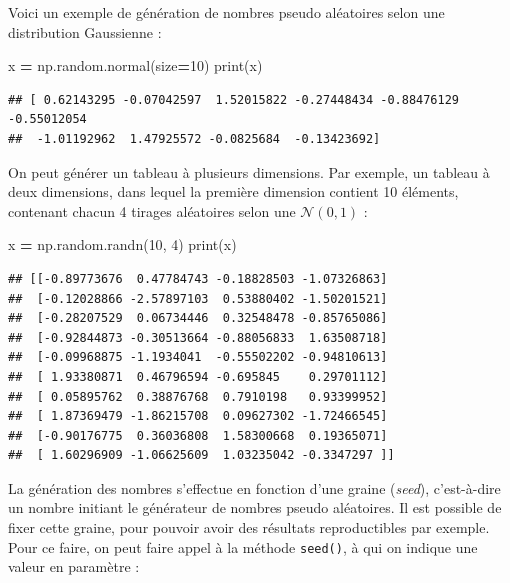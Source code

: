 \documentclass[12pt,]{book}
\newenvironment{Shaded}{\begin{snugshade}}{\end{snugshade}}
\newcommand{\DecValTok}[1]{\textcolor[rgb]{0.00,0.00,0.81}{#1}}
\newcommand{\OperatorTok}[1]{\textcolor[rgb]{0.81,0.36,0.00}{\textbf{#1}}}
\newcommand{\BuiltInTok}[1]{#1}
\newcommand{\NormalTok}[1]{#1}
\numberwithin{equation}{section}
\numberwithin{countremarque}{section}
\begin{document}
Voici un exemple de génération de nombres pseudo aléatoires selon une
distribution Gaussienne :

\begin{Shaded}
\begin{Highlighting}[]
\NormalTok{x }\OperatorTok{=}\NormalTok{ np.random.normal(size}\OperatorTok{=}\DecValTok{10}\NormalTok{)}
\BuiltInTok{print}\NormalTok{(x)}
\end{Highlighting}
\end{Shaded}

\begin{lstlisting}
## [ 0.62143295 -0.07042597  1.52015822 -0.27448434 -0.88476129 -0.55012054
##  -1.01192962  1.47925572 -0.0825684  -0.13423692]
\end{lstlisting}

On peut générer un tableau à plusieurs dimensions. Par exemple, un
tableau à deux dimensions, dans lequel la première dimension contient 10
éléments, contenant chacun 4 tirages aléatoires selon une
\(\mathcal{N}(0,1)\) :

\begin{Shaded}
\begin{Highlighting}[]
\NormalTok{x }\OperatorTok{=}\NormalTok{ np.random.randn(}\DecValTok{10}\NormalTok{, }\DecValTok{4}\NormalTok{)}
\BuiltInTok{print}\NormalTok{(x)}
\end{Highlighting}
\end{Shaded}

\begin{lstlisting}
## [[-0.89773676  0.47784743 -0.18828503 -1.07326863]
##  [-0.12028866 -2.57897103  0.53880402 -1.50201521]
##  [-0.28207529  0.06734446  0.32548478 -0.85765086]
##  [-0.92844873 -0.30513664 -0.88056833  1.63508718]
##  [-0.09968875 -1.1934041  -0.55502202 -0.94810613]
##  [ 1.93380871  0.46796594 -0.695845    0.29701112]
##  [ 0.05895762  0.38876768  0.7910198   0.93399952]
##  [ 1.87369479 -1.86215708  0.09627302 -1.72466545]
##  [-0.90176775  0.36036808  1.58300668  0.19365071]
##  [ 1.60296909 -1.06625609  1.03235042 -0.3347297 ]]
\end{lstlisting}

La génération des nombres s'effectue en fonction d'une graine
(\emph{seed}), c'est-à-dire un nombre initiant le générateur de nombres
pseudo aléatoires. Il est possible de fixer cette graine, pour pouvoir
avoir des résultats reproductibles par exemple. Pour ce faire, on peut
faire appel à la méthode \texttt{seed()}, à qui on indique une valeur en
paramètre :
\end{document}

